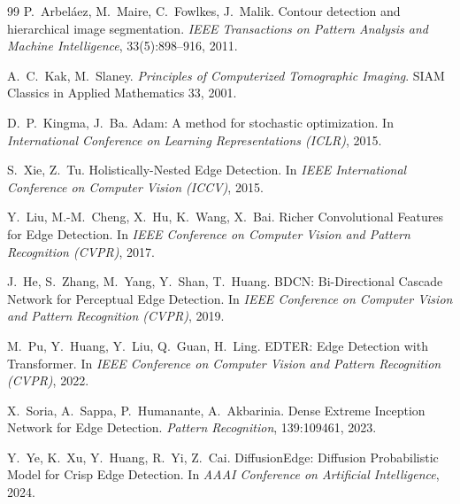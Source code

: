 \documentclass[11pt,a4paper]{article}
\begin{document}
\begin{thebibliography}{99}
P.~Arbeláez, M.~Maire, C.~Fowlkes, J.~Malik.
\newblock Contour detection and hierarchical image segmentation.
\newblock \emph{IEEE Transactions on Pattern Analysis and Machine Intelligence}, 33(5):898--916, 2011.

A.~C.~Kak, M.~Slaney.
\newblock \emph{Principles of Computerized Tomographic Imaging}.
\newblock SIAM Classics in Applied Mathematics 33, 2001.

D.~P.~Kingma, J.~Ba.
\newblock Adam: A method for stochastic optimization.
\newblock In \emph{International Conference on Learning Representations (ICLR)}, 2015.

S.~Xie, Z.~Tu.
\newblock Holistically-Nested Edge Detection.
\newblock In \emph{IEEE International Conference on Computer Vision (ICCV)}, 2015.

Y.~Liu, M.-M.~Cheng, X.~Hu, K.~Wang, X.~Bai.
\newblock Richer Convolutional Features for Edge Detection.
\newblock In \emph{IEEE Conference on Computer Vision and Pattern Recognition (CVPR)}, 2017.

J.~He, S.~Zhang, M.~Yang, Y.~Shan, T.~Huang.
\newblock BDCN: Bi-Directional Cascade Network for Perceptual Edge Detection.
\newblock In \emph{IEEE Conference on Computer Vision and Pattern Recognition (CVPR)}, 2019.

M.~Pu, Y.~Huang, Y.~Liu, Q.~Guan, H.~Ling.
\newblock EDTER: Edge Detection with Transformer.
\newblock In \emph{IEEE Conference on Computer Vision and Pattern Recognition (CVPR)}, 2022.

X.~Soria, A.~Sappa, P.~Humanante, A.~Akbarinia.
\newblock Dense Extreme Inception Network for Edge Detection.
\newblock \emph{Pattern Recognition}, 139:109461, 2023.

Y.~Ye, K.~Xu, Y.~Huang, R.~Yi, Z.~Cai.
\newblock DiffusionEdge: Diffusion Probabilistic Model for Crisp Edge Detection.
\newblock In \emph{AAAI Conference on Artificial Intelligence}, 2024.

\end{thebibliography}
\end{document}
